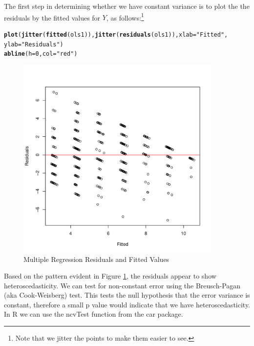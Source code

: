 \documentclass[11pt,openany]{book}\usepackage[]{graphicx}\usepackage[]{color}
\makeatletter
\newcommand{\hlnum}[1]{\textcolor[rgb]{0.686,0.059,0.569}{#1}}%
\newcommand{\hlstr}[1]{\textcolor[rgb]{0.192,0.494,0.8}{#1}}%
\newcommand{\hlstd}[1]{\textcolor[rgb]{0.345,0.345,0.345}{#1}}%
\newcommand{\hlkwc}[1]{\textcolor[rgb]{0.333,0.667,0.333}{#1}}%
\newcommand{\hlkwd}[1]{\textcolor[rgb]{0.737,0.353,0.396}{\textbf{#1}}}%
\newenvironment{kframe}{%
 \def\at@end@of@kframe{}%
 \ifinner\ifhmode%
  \def\at@end@of@kframe{\end{minipage}}%
  \begin{minipage}{\columnwidth}%
 \fi\fi%
 \def\FrameCommand##1{\hskip\@totalleftmargin \hskip-\fboxsep
 \colorbox{shadecolor}{##1}\hskip-\fboxsep
     \hskip-\linewidth \hskip-\@totalleftmargin \hskip\columnwidth}%
 \MakeFramed {\advance\hsize-\width
   \@totalleftmargin\z@ \linewidth\hsize
   \@setminipage}}%
 {\par\unskip\endMakeFramed%
 \at@end@of@kframe}
\newenvironment{knitrout}{}{} %
\renewenvironment{knitrout}{\begin{singlespace}}{\end{singlespace}}
\makeatother
\begin{document}
The first step in determining whether we have constant variance is to plot the the residuals by the fitted values for $Y$, as follows:\footnote{Note that we jitter the points to make them easier to see.}

\begin{knitrout}
\color{fgcolor}\begin{kframe}
\begin{alltt}
\hlkwd{plot}\hlstd{(}\hlkwd{jitter}\hlstd{(}\hlkwd{fitted}\hlstd{(ols1)),} \hlkwd{jitter}\hlstd{(}\hlkwd{residuals}\hlstd{(ols1)),} \hlkwc{xlab} \hlstd{=} \hlstr{"Fitted"}\hlstd{,}
    \hlkwc{ylab} \hlstd{=} \hlstr{"Residuals"}\hlstd{)}
\hlkwd{abline}\hlstd{(}\hlkwc{h} \hlstd{=} \hlnum{0}\hlstd{,} \hlkwc{col} \hlstd{=} \hlstr{"red"}\hlstd{)}
\end{alltt}
\end{kframe}
\end{knitrout}

\begin{figure}
        \centering
        \includegraphics[width=4in]{15_Diagnostics/multregres.pdf}%
        \caption{Multiple Regression Residuals and Fitted Values \label{fig:multregres}}
\end{figure}

\noindent Based on the pattern evident in Figure \ref{fig:multregres}, the residuals
appear to show heteroscedasticity. We can test for non-constant error using the Breusch-Pagan (aka Cook-Weisberg) test. This tests the null hypothesis that the error variance is constant, therefore a small p value would indicate that we have heteroscedasticity. In R we can use the ncvTest function from the car package.
\end{document}

